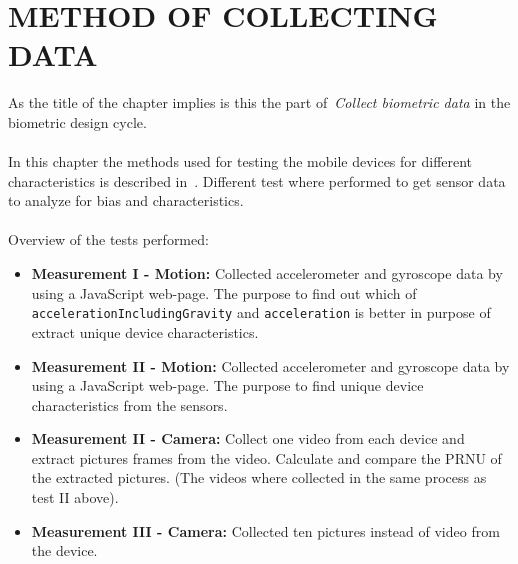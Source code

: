 \chapter{METHOD OF COLLECTING DATA}\label{cha:measurements}
As the title of the chapter implies is this the part of~\textit{Collect biometric data} in the biometric design cycle.\\
\\
In this chapter the methods used for testing the mobile devices for different characteristics is described in~. Different test where performed to get sensor data to analyze for bias and characteristics. \\
\\
Overview of the tests performed:
\begin{itemize}
  \item[] \textbf{Measurement I - Motion:} Collected accelerometer and gyroscope data by using a JavaScript web-page. The purpose to find out which of \texttt{accelerationIncludingGravity} and \texttt{acceleration} is better in purpose of extract unique device characteristics.
  \item[] \textbf{Measurement II - Motion:} Collected accelerometer and gyroscope data by using a JavaScript web-page. The purpose to find unique device characteristics from the sensors. 
  \item[] \textbf{Measurement II - Camera:} Collect one video from each device and extract pictures frames from the video. Calculate and compare the PRNU of the extracted pictures. (The videos where collected in the same process as test II above).
  \item[] \textbf{Measurement III - Camera:} Collected ten pictures instead of video from the device. 
\end{itemize}

